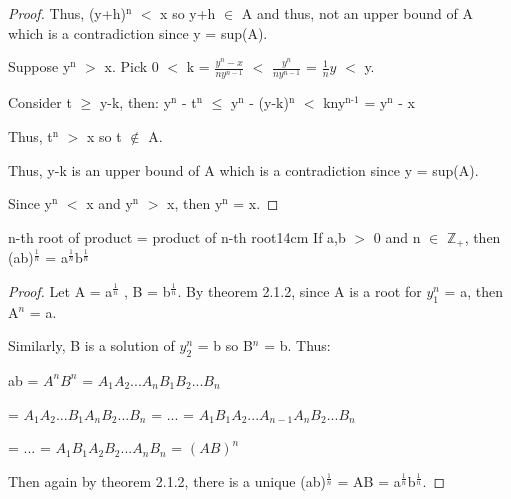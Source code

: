 \begin{proof}
		\begin{adjustbox}{minipage=14.2cm, right, vspace=0.1cm 0cm}
			Thus, (y+h)$^\text{n}$ $<$ x so y+h $\in$ A and thus, not an upper bound of A
			which is a contradiction since y = sup(A).
		\end{adjustbox}

		Suppose y$^\text{n}$ $>$ x.
		Pick 0 $<$ k = $\frac{y^n - x}{ny^{n-1}}$ $<$ $\frac{y^n}{ny^{n-1}}$
		= $\frac{1}{n}y$ $<$ y.

		\hspace{1cm}
		Consider t $ \geq $  y-k, then:
		y$^\text{n}$ - t$^\text{n}$ $ \leq $  y$^\text{n}$ - (y-k)$^\text{n}$ $<$
		kny$^\text{n-1}$ = y$^\text{n}$ - x

		\hspace{1cm}
		Thus, t$^\text{n}$ $>$ x so t $\not \in$ A.

		\hspace{1cm}
		Thus, y-k is an upper bound of A which is a contradiction since y = sup(A).

		Since y$^\text{n}$ $<$ x and y$^\text{n}$ $>$ x, then y$^\text{n}$ = x.
	\end{proof}

	\newpage



	\begin{corollary}{n-th root of product = product of n-th root}{14cm}
		If a,b $>$ 0 and n $\in$ $\mathbb{Z}_+$, then
		(ab)$^{\frac{1}{n}}$ = a$^{\frac{1}{n}}$b$^{\frac{1}{n}}$
	\end{corollary}
	
	\begin{proof}
		Let A = a$^{\frac{1}{n}}$ , B = b$^{\frac{1}{n}}$.
		By {\color{red} theorem 2.1.2}, since A is a root for
		$y_1^n$ = a, then A$^n$ = a.

		Similarly, B is a solution of $y_2^n$ = b so B$^n$ = b. Thus:

		\hspace{1cm} ab = $A^n$$B^n$ = $A_1A_2...A_nB_1B_2...B_n$

		\hspace{1.6cm} = $A_1A_2...B_1A_nB_2...B_n$
		= ... = $A_1B_1A_2...A_{n-1}A_nB_2...B_n$

		\hspace{1.6cm} = ... = $A_1B_1A_2B_2...A_nB_n$ = $(AB)^n$

		Then again by {\color{red} theorem 2.1.2}, there is a unique
		(ab)$^{\frac{1}{n}}$ = AB = a$^{\frac{1}{n}}$b$^{\frac{1}{n}}$.		
	\end{proof}

